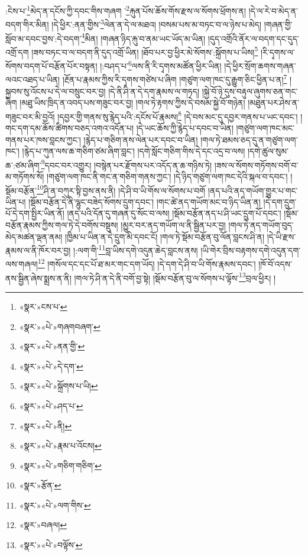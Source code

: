 :ངེས་པ་\footnote{«སྣར་»ངས་པ་}མེད་ན་དངོས་ཀྱི་དབང་གིས་གཞག ་\footnote{«སྣར་»«པེ་»གཞགབཞག་}རྐུན་པོས་ཆོས་གོས་རྫས་ལ་སོགས་ཕྲོགས་ན། །དེ་ལ་རེ་བ་མེད་ན་བདག་གིར་མིན། །དེ་ཕྱིར་:ནན་གྱིས་\footnote{«སྣར་»«པེ་»ནན་གྱི་}ལེན་ན་དེ་ལ་མཐའ། །བསམ་པས་མ་བཏང་བ་ལ་ཉེས་པ་མེད། །གཞན་གྱི་སློབ་མ་དབང་བྱས་:དེ་བདག་\footnote{«སྣར་»«པེ་»དེ་དག་}མིན། །གཞན་ཉིད་རྐུ་བ་ནམ་ཡང་ཡོད་མ་ཡིན། །དུད་འགྲོའི་ནོར་ལ་བདག་དང་དུད་འགྲོ་དག །ཟས་བཏང་བ་ལ་བདག་ནི་དུད་འགྲོ་ཡིན། །ཐོབ་པར་བྱ་ཕྱིར་མེ་སོགས་:སྐྲོགས་པ་ཡིས།\footnote{«སྣར་»«པེ་»སྐྲོགས་པ་ཡི།} །རི་དྭགས་ལ་སོགས་བདག་པོ་བརྩོན་པོར་བསྟན། །:བཤད་པ་\footnote{«སྣར་»«པེ་»ཤད་པ་}ལས་ནི་རི་དྭགས་མཚོན་ཕྱིར་ཡིན། །དེ་ཕྱིར་སྲོག་ཆགས་གཞན་ལའང་འཐད་པ་ཡིན། །རྔོན་པ་རྣམས་ཀྱིས་རི་དྭགས་གཙེས་པ་ཞིག །གཙུག་ལག་ཁང་དུ་རྒྱུག་ཅིང་ཕྱིན་པ་ན།\footnote{«སྣར་»«པེ་»ནི།} །སྐྱབས་སུ་འོངས་པ་དེ་ལ་བསྲུང་བར་བྱ། །དེ་ནི་ཤི་ན་དེ་དག་རྣམས་ལ་གཏད། །སྐྱེ་བོ་ཉེ་དུས་བརྟུལ་ཞུགས་ཅན་གང་ཞིག །མཐུ་ཡིས་ཁྲིད་ན་འབད་པས་གཟུང་བར་བྱ། །གལ་ཏེ་རྟགས་ཀྱིས་དེ་བསམ་སྐྱེ་བོ་གཉེན། །མཐུན་པར་ཤེས་ན་གཟུང་བར་མི་བྱའོ། །དབྱར་གྱི་གནས་སུ་རྙེད་པའི་:དངོས་པོ་རྣམས།\footnote{«སྣར་»«པེ་»རྣམ་པ་འོངས།} །དེ་བས་མང་དུ་དབྱར་གནས་པ་ཡང་དབང་། །གང་དག་དམ་ཆོས་ཚིགས་བཅད་འགའ་འདོན་པ། །དེ་ཡང་ཆོས་ཀྱི་རྙེད་པ་དབང་བ་ཡིན། །གཙུག་ལག་ཁང་མང་གནས་པར་ཁས་བླངས་ཀྱང་། །རྙེད་པ་གཅིག་ནས་ལེན་པར་དབང་བ་ཡིན། །གལ་ཏེ་ཐམས་ཅད་དུ་ན་གཙུག་ལག་ཁང་། །རྙེད་པ་ཀུན་ལས་ཆ་གཅིག་ཙམ་ཞིག་བླང་། །དགེ་སློང་གཅིག་གིས་དེ་དང་འདྲ་བ་ལས། །དགེ་ཚུལ་སུམ་ཆ་:ཙམ་ཞིག་\footnote{«སྣར་»«པེ་»གཅིག་གཅིག་}དབང་བར་འགྱུར། །བསྙེན་པར་རྫོགས་པར་འདོད་ན་ཆ་གཉིས་ཏེ། །ཟས་ལ་སོགས་གཏོགས་བགོ་བ་མ་གཏོགས་སོ། །གཙུག་ལག་ཁང་ནི་གང་ན་གཅིག་གནས་ཀྱང་། །དེ་ཉིད་གཙུག་ལག་ཁང་དེའི་སྐལ་བ་དབང་། །སྡོམ་བརྩོན་\footnote{«སྣར་»རྩོན་}ཤི་ན་བཀུར་སྟི་བྱས་ནས་ནི། །དེ་ཤི་བ་ཡི་གོས་ལ་སོགས་པ་བགོ །ནད་པའི་ནད་གཡོག་གྱུར་པ་གང་ཡིན་པ། །སྡོམ་བརྩོན་དེ་ནི་ལྷུང་བཟེད་སོགས་དྲུག་དབང་། །གང་ཚེ་ནད་གཡོག་མང་བ་ཉིད་ཡིན་ན། །དེ་དག་དྲུག་པོ་དེ་དག་སྤྱིར་ཡིན་ནོ། །ནད་པའི་དོན་དུ་གཞན་དུ་སོང་བ་ལས། །སྡོམ་བརྩོན་ནད་པ་ཤི་ཡང་དྲུག་པོ་དབང་། །སྡོམ་བརྩོན་རྣམས་ཀྱིས་གལ་ཏེ་དེ་བགོས་བསྡུས། །མྱུར་བར་ནད་གཡོག་ལ་ནི་སྦྱིན་པར་བྱ། །གལ་ཏེ་ནད་གཡོག་བུད་མེད་མཚན་ལྡན་ནམ། །ཁྱིམ་པ་ཡིན་ན་དེ་དྲུག་མི་དབང་ངོ། །གལ་ཏེ་སྡོམ་བརྩོན་བུ་ལོན་བླངས་ཤི་ན། །དེ་ཡི་རྫས་རྣམས་ལ་ནི་ཁོར་བར་བྱ། །:ལག་གི་\footnote{«སྣར་»«པེ་»ལག་གིས་}བླ་ཡིས་དགེ་འདུན་ཆེད་བླངས་ནས། །ཡི་གེར་བྲིས་བརྟགས་དགེ་འདུན་དག་ལས་གཞལ།\footnote{«སྣར་»བཞལ།} །གསོལ་དང་དང་པོ་ཐ་མར་གང་དག་ཡོད། །དེ་དག་དེ་ཤི་བ་ཡི་གོས་རྣམས་དབང་། །ཁོ་བོ་འདས་ནས་སྦྱིན་ཞེས་སྨྲས་ན་ནི། །གལ་ཏེ་ཤི་ན་དེ་ནི་བགོ་བྱ་སྟེ། །སྡོམ་བརྩོན་བུ་ལ་སོགས་པ་ལྟོས་\footnote{«སྣར་»«པེ་»བལྟོས་}བྲལ་ཕྱིར། །
